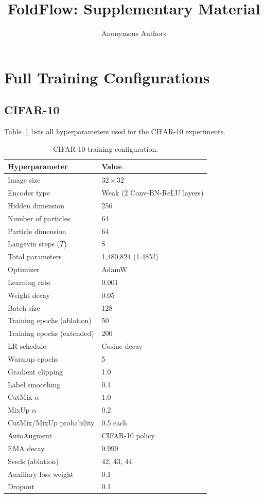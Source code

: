 \documentclass[10pt]{article}
\title{FoldFlow: Supplementary Material}
\author{Anonymous Authors}
\begin{document}
\maketitle

\appendix

\section{Full Training Configurations}
\label{app:configs}

\subsection{CIFAR-10}

Table~\ref{tab:cifar_config} lists all hyperparameters used for the
CIFAR-10 experiments.

\begin{table}[h]
\centering
\caption{CIFAR-10 training configuration.}
\label{tab:cifar_config}
\small
\begin{tabular}{@{}ll@{}}
\toprule
Hyperparameter & Value \\
\midrule
Image size & $32 \times 32$ \\
Encoder type & Weak (2 Conv-BN-ReLU layers) \\
Hidden dimension & 256 \\
Number of particles & 64 \\
Particle dimension & 64 \\
Langevin steps ($T$) & 8 \\
Total parameters & 1,480,824 (1.48M) \\
\midrule
Optimizer & AdamW \\
Learning rate & 0.001 \\
Weight decay & 0.05 \\
Batch size & 128 \\
Training epochs (ablation) & 50 \\
Training epochs (extended) & 200 \\
LR schedule & Cosine decay \\
Warmup epochs & 5 \\
Gradient clipping & 1.0 \\
Label smoothing & 0.1 \\
\midrule
CutMix $\alpha$ & 1.0 \\
MixUp $\alpha$ & 0.2 \\
CutMix/MixUp probability & 0.5 each \\
AutoAugment & CIFAR-10 policy \\
EMA decay & 0.999 \\
\midrule
Seeds (ablation) & 42, 43, 44 \\
Auxiliary loss weight & 0.1 \\
Dropout & 0.1 \\
\bottomrule
\end{tabular}
\end{table}
\end{document}
